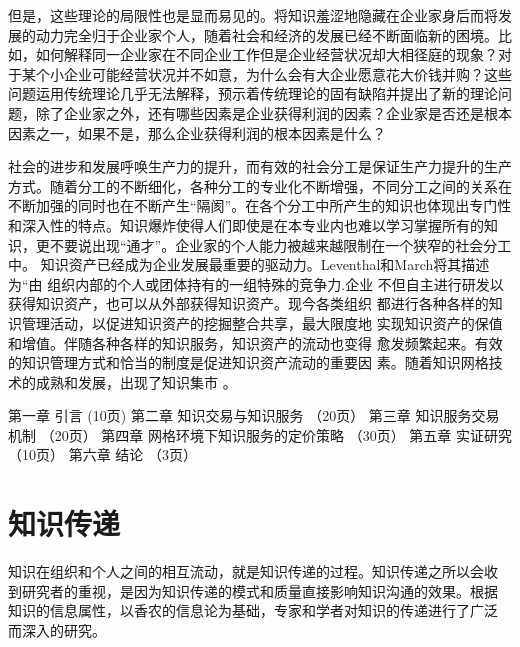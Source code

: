 \documentclass[12pt,a4paper]{ctexart}
\begin{document}
但是，这些理论的局限性也是显而易见的。将知识羞涩地隐藏在企业家身后而将发展的动力完全归于企业家个人，随着社会和经济的发展已经不断面临新的困境。比如，如何解释同一企业家在不同企业工作但是企业经营状况却大相径庭的现象？对于某个小企业可能经营状况并不如意，为什么会有大企业愿意花大价钱并购？这些问题运用传统理论几乎无法解释，预示着传统理论的固有缺陷并提出了新的理论问题，除了企业家之外，还有哪些因素是企业获得利润的因素？企业家是否还是根本因素之一，如果不是，那么企业获得利润的根本因素是什么？

社会的进步和发展呼唤生产力的提升，而有效的社会分工是保证生产力提升的生产方式。随着分工的不断细化，各种分工的专业化不断增强，不同分工之间的关系在不断加强的同时也在不断产生“隔阂”。在各个分工中所产生的知识也体现出专门性和深入性的特点。知识爆炸使得人们即使是在本专业内也难以学习掌握所有的知识，更不要说出现“通才”。企业家的个人能力被越来越限制在一个狭窄的社会分工中。
知识资产已经成为企业发展最重要的驱动力。Leventhal和March将其描述为“由
组织内部的个人或团体持有的一组特殊的竞争力\cite{levinthal1993ml}.企业
不但自主进行研发以获得知识资产，也可以从外部获得知识资产。现今各类组织
都进行各种各样的知识管理活动，以促进知识资产的挖掘整合共享，最大限度地
实现知识资产的保值和增值。伴随各种各样的知识服务，知识资产的流动也变得
愈发频繁起来。有效的知识管理方式和恰当的制度是促进知识资产流动的重要因
素。随着知识网格技术的成熟和发展，出现了知识集市 。\cite{Andreas2007}

第一章	引言 (10页)
第二章	知识交易与知识服务 （20页）
第三章	知识服务交易机制  （20页）
第四章	网格环境下知识服务的定价策略 （30页）
第五章	实证研究 （10页）
第六章	结论  （3页）

\section{知识传递}
知识在组织和个人之间的相互流动，就是知识传递的过程。知识传递之所以会收
到研究者的重视，是因为知识传递的模式和质量直接影响知识沟通的效果。根据
知识的信息属性，以香农的信息论为基础，专家和学者对知识的传递进行了广泛
而深入的研究。





\end{document}
